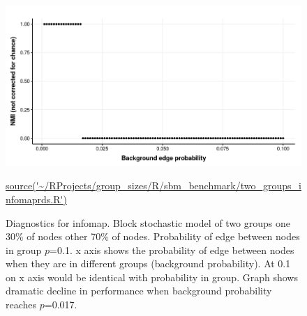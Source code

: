 \begin{figure}
    \centering
    \includegraphics[width=\textwidth]{images/chaptercommunity/ggplot2/sbm_benchmark/Rplot_infomap_sbmtwogroups_theme.png}
    \caption{Diagnostics for infomap. Block stochastic model of two groups one 30\% of nodes other 70\% of nodes. Probability of edge between nodes in group $p$=0.1. x axis shows the probability of edge between nodes when they are in different groups (background probability). At 0.1 on x axis would be identical with probability in group. Graph shows dramatic decline in performance when background probability reaches $p$=0.017.}
    \tiny\url{source('~/RProjects/group_sizes/R/sbm_benchmark/two_groups_infomaprds.R')}
    \label{fig:my_nice_infomap}
\end{figure}




